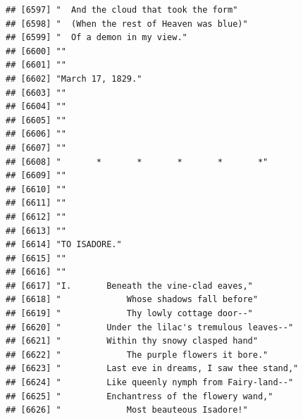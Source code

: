 \documentclass{article}\usepackage[]{graphicx}\usepackage[]{color}
\makeatletter
\newenvironment{kframe}{%
 \def\at@end@of@kframe{}%
 \ifinner\ifhmode%
  \def\at@end@of@kframe{\end{minipage}}%
  \begin{minipage}{\columnwidth}%
 \fi\fi%
 \def\FrameCommand##1{\hskip\@totalleftmargin \hskip-\fboxsep
 \colorbox{shadecolor}{##1}\hskip-\fboxsep
     \hskip-\linewidth \hskip-\@totalleftmargin \hskip\columnwidth}%
 \MakeFramed {\advance\hsize-\width
   \@totalleftmargin\z@ \linewidth\hsize
   \@setminipage}}%
 {\par\unskip\endMakeFramed%
 \at@end@of@kframe}
\newenvironment{knitrout}{}{} %
\makeatother
\begin{document}
\begin{knitrout}
\begin{kframe}
\begin{verbatim}
## [6597] "  And the cloud that took the form"                                          
## [6598] "  (When the rest of Heaven was blue)"                                        
## [6599] "  Of a demon in my view."                                                    
## [6600] ""                                                                            
## [6601] ""                                                                            
## [6602] "March 17, 1829."                                                             
## [6603] ""                                                                            
## [6604] ""                                                                            
## [6605] ""                                                                            
## [6606] ""                                                                            
## [6607] ""                                                                            
## [6608] "       *       *       *       *       *"                                    
## [6609] ""                                                                            
## [6610] ""                                                                            
## [6611] ""                                                                            
## [6612] ""                                                                            
## [6613] ""                                                                            
## [6614] "TO ISADORE."                                                                 
## [6615] ""                                                                            
## [6616] ""                                                                            
## [6617] "I.       Beneath the vine-clad eaves,"                                       
## [6618] "             Whose shadows fall before"                                      
## [6619] "             Thy lowly cottage door--"                                       
## [6620] "         Under the lilac's tremulous leaves--"                               
## [6621] "         Within thy snowy clasped hand"                                      
## [6622] "             The purple flowers it bore."                                    
## [6623] "         Last eve in dreams, I saw thee stand,"                              
## [6624] "         Like queenly nymph from Fairy-land--"                               
## [6625] "         Enchantress of the flowery wand,"                                   
## [6626] "             Most beauteous Isadore!"                                        

\end{verbatim}
\end{kframe}
\end{knitrout}
\end{document}
